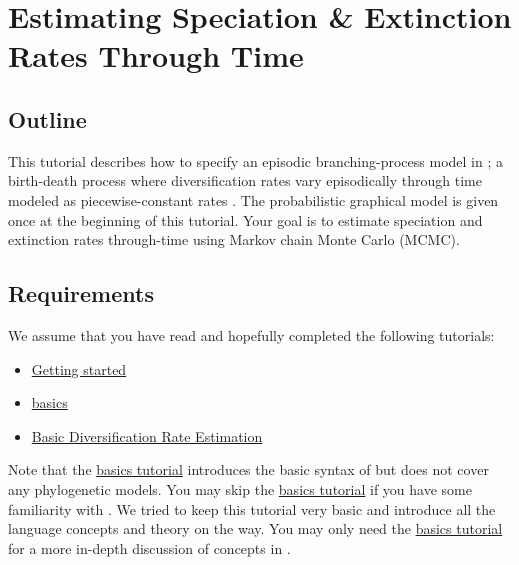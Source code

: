 \section{Estimating Speciation \& Extinction Rates Through Time}

\subsection{Outline}

This tutorial describes how to specify an episodic branching-process model in \RevBayes; a birth-death process where diversification rates vary episodically through time modeled as piecewise-constant rates \citep{Stadler2011,Hoehna2015a}.
The probabilistic graphical model is given once at the beginning of this tutorial.
Your goal is to estimate speciation and extinction rates through-time using Markov chain Monte Carlo (MCMC).


\subsection{Requirements}
We assume that you have read and hopefully completed the following tutorials:
\begin{itemize}
\item \href{https://github.com/revbayes/revbayes_tutorial/raw/master/tutorial_TeX/RB_Getting_Started/RB_Getting_Started.pdf}{Getting started}
\item \href{https://github.com/revbayes/revbayes_tutorial/raw/master/tutorial_TeX/RB_Basics_Tutorial/RB_Basics_Tutorial.pdf}{\Rev basics}
\item \href{https://github.com/revbayes/revbayes_tutorial/raw/master/tutorial_TeX/RB_DiversificationRate_Tutorial/RB_DiversificationRate_Tutorial.pdf}{Basic Diversification Rate Estimation}
\end{itemize}
Note that the \href{https://github.com/revbayes/revbayes_tutorial/raw/master/tutorial_TeX/RB_Basics_Tutorial/RB_Basics_Tutorial.pdf}{\Rev basics tutorial} introduces the basic syntax of \Rev but does not cover any phylogenetic models.
You may skip the \href{https://github.com/revbayes/revbayes_tutorial/raw/master/tutorial_TeX/RB_Basics_Tutorial/RB_Basics_Tutorial.pdf}{\Rev basics tutorial} if you have some familiarity with \R.
We tried to keep this tutorial very basic and introduce all the language concepts and theory on the way.
You may only need the \href{https://github.com/revbayes/revbayes_tutorial/raw/master/tutorial_TeX/RB_Basics_Tutorial/RB_Basics_Tutorial.pdf}{\Rev basics tutorial} for a more in-depth discussion of concepts in \Rev.


